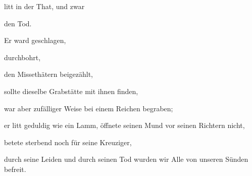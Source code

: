 \begin{aufza}
\begin{aufzb}
\item {} litt in der That, und zwar 
\item den Tod.
\item Er ward geschlagen,
\item durchbohrt,
\item den Missethätern beigezählt,
\item sollte dieselbe Grabstätte mit ihnen finden,
\item war aber zufälliger Weise bei einem Reichen begraben;
\item er litt geduldig wie ein Lamm, öffnete seinen Mund vor seinen Richtern nicht,
\item betete sterbend noch für seine Kreuziger,
\item durch seine Leiden und durch seinen Tod wurden wir Alle von unseren Sünden befreit.~
\end{aufzb}
\end{aufza}


